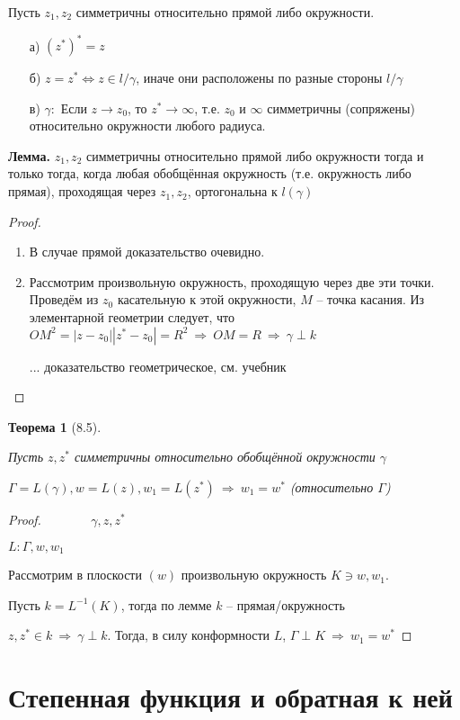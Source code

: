 \documentclass[final]{report}
\newcommand{\forcenewline}{$\phantom{\mbox{newline}}$\newline}
\newcommand{\then}{\ \Rightarrow\ }
\newcommand{\LRA}{\Leftrightarrow}
\newcommand{\g}{\gamma}
\newtheorem*{theor}{Теорема}
\theoremstyle{remark}
\begin{document}
Пусть $z_1, z_2$ симметричны относительно прямой либо окружности.
\begin{enumerate}
\item[а)] $(z^*)^*=z$
\item[б)] $z=z^* \LRA z\in l/\g$, иначе они расположены по разные стороны $l/\g$
\item[в)] $\g\colon$ Если $z\to z_0$, то $z^*\to\infty$, т.е. $z_0$ и $\infty$ симметричны (сопряжены) относительно окружности любого радиуса.
\end{enumerate}

{\bfseries Лемма.} $z_1, z_2$ симметричны относительно прямой либо окружности тогда и только тогда, когда любая обобщённая окружность (т.е. окружность либо прямая), проходящая через $z_1, z_2$, ортогональна к $l(\g)$
\begin{proof}
\begin{enumerate}
\item В случае прямой доказательство очевидно.
\item Рассмотрим произвольную окружность, проходящую через две эти точки. Проведём из $z_0$ касательную к этой окружности, $M$ -- точка касания. Из элементарной геометрии следует, что $OM^2=|z-z_0||z^*-z_0|=R^2 \then OM=R \then \g\perp k$

... доказательство геометрическое, см. учебник
\end{enumerate}
\end{proof}

\begin{theor}[8.5]
\forcenewline

Пусть $z,z^*$ симметричны относительно обобщённой окружности $\g$

$\Gamma=L(\g), w=L(z), w_1=L(z^*) \then w_1=w^*$ (относительно $\Gamma$)
\end{theor}

\begin{proof}
\forcenewline
$\g,z,z^*$

$L\colon \Gamma,w,w_1$

Рассмотрим в плоскости $(w)$ произвольную окружность $K\ni w,w_1$.

Пусть $k=L^{-1}(K)$, тогда по лемме $k$ -- прямая/окружность

$z,z^*\in k\then \g\perp k$. Тогда, в силу конформности $L$, $\Gamma\perp K \then w_1=w^*$
\end{proof}

\newpage

\section{Степенная функция и обратная к ней}
\end{document}
